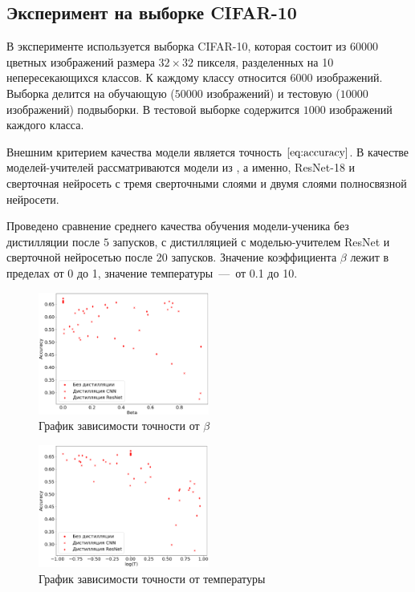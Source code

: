 \documentclass[12pt, twoside]{article}
\begin{document}
\subsection{Эксперимент на выборке CIFAR-10}
В эксперименте используется выборка CIFAR-10, которая состоит из $60000$ цветных изображений размера $32 \times 32$ пикселя, разделенных на 10 непересекающихся классов. К каждому классу относится $6000$ изображений. Выборка делится на обучающую ($50000$ изображений) и тестовую ($10000$ изображений) подвыборки. В тестовой выборке содержится $1000$ изображений каждого класса.

Внешним критерием качества модели является точность $\eqref{eq:accuracy}$. В качестве моделей-учителей рассматриваются модели из \cite{conf/cvpr/PassalisTT20}, а именно, ResNet-18 и сверточная нейросеть с тремя сверточными слоями и двумя слоями полносвязной нейросети.

Проведено сравнение среднего качества обучения модели-ученика без дистилляции после $5$ запусков, с дистилляцией с моделью-учителем ResNet и сверточной нейросетью после 20 запусков. Значение коэффициента $\beta$ лежит в пределах от 0 до 1, значение температуры~---~от 0.1 до 10.

\begin{figure}[!ht]
    \centering
    \includegraphics[width=0.5\textwidth]{scatter_beta_acc.eps}
    \caption{График зависимости точности от $\beta$}
    \label{fig:beta_acc}
\end{figure}

\begin{figure}[!ht]
    \centering
    \includegraphics[width=0.5\textwidth]{scatter_temp_acc.eps}
    \caption{График зависимости точности от температуры}
    \label{fig:temp_acc}
\end{figure}
\end{document}

